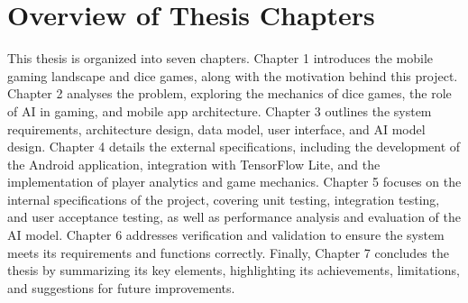\section{Overview of Thesis Chapters}
This thesis is organized into seven chapters. Chapter 1 introduces the mobile gaming landscape and dice games, along with the motivation behind this project. Chapter 2 analyses the problem, exploring the mechanics of dice games, the role of AI in gaming, and mobile app architecture. Chapter 3 outlines the system requirements, architecture design, data model, user interface, and AI model design. Chapter 4 details the external specifications, including the development of the Android application, integration with TensorFlow Lite, and the implementation of player analytics and game mechanics. Chapter 5 focuses on the internal specifications of the project, covering unit testing, integration testing, and user acceptance testing, as well as performance analysis and evaluation of the AI model. Chapter 6 addresses verification and validation to ensure the system meets its requirements and functions correctly. Finally, Chapter 7 concludes the thesis by summarizing its key elements, highlighting its achievements, limitations, and suggestions for future improvements.
